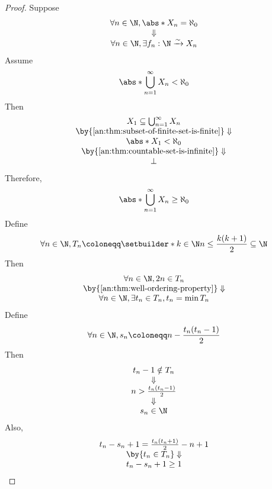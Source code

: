 \begin{proof}
  Suppose
  \[
    \begin{array}{c}
      \forall n \in \N, \abs*{X_{n}} = \aleph_{0} \\
      \Downarrow                                  \\
      \forall n \in \N, \exists f_{n}: \N \xrightarrow{\sim} X_{n}
    \end{array}
  \]
  Assume
  \[
    \abs*{\bigcup_{n = 1}^{\infty} X_{n}} < \aleph_{0}
  \]
  Then
  \[
    \begin{array}{c}
      X_{1} \subseteq \bigcup_{n = 1}^{\infty} X_{n}               \\
      \by{\Cref{an:thm:subset-of-finite-set-is-finite}} \Downarrow \\
      \abs*{X_{1}} < \aleph_{0}                                    \\
      \by{\Cref{an:thm:countable-set-is-infinite}} \Downarrow      \\
      \bot
    \end{array}
  \]
  Therefore,
  \[
    \abs*{\bigcup_{n = 1}^{\infty} X_{n}} \geq \aleph_{0}
  \]
  Define
  \[
    \forall n \in \N, T_{n} \coloneqq \setbuilder*{k \in \N}{n \leq \frac{k(k + 1)}{2}} \subseteq \N
  \]
  Then
  \[
    \begin{array}{c}
      \forall n \in \N, 2n \in T_{n}                       \\
      \by{\Cref{an:thm:well-ordering-property}} \Downarrow \\
      \forall n \in \N, \exists t_{n} \in T_{n}, t_{n} = \min T_{n}
    \end{array}
  \]
  Define
  \[
    \forall n \in \N, s_{n} \coloneqq n - \frac{t_{n}(t_{n} - 1)}{2}
  \]
  Then
  \[
    \begin{array}{c}
      t_{n} - 1 \notin T_{n}         \\
      \Downarrow                     \\
      n > \frac{t_{n}(t_{n} - 1)}{2} \\
      \Downarrow                     \\
      s_{n} \in \N
    \end{array}
  \]
  Also,
  \[
    \begin{array}{c}
      t_{n} - s_{n} + 1 = \frac{t_{n}(t_{n} + 1)}{2} - n + 1 \\
      \by{\ensuremath{t_{n} \in T_{n}}} \Downarrow           \\
      t_{n} - s_{n} + 1 \geq 1                               \\

\end{array}\]
\end{proof}
